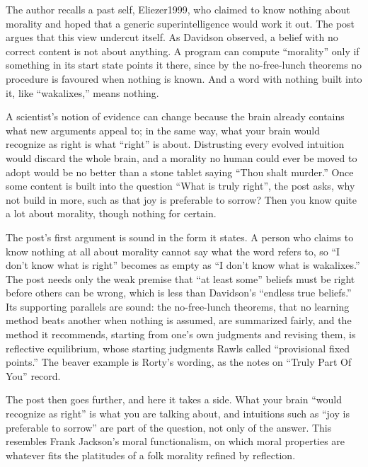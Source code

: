 \begin{afterword}
\summaryhead

The author recalls a past self, Eliezer1999, who claimed to know nothing about morality and hoped that a generic superintelligence would work it out. The post argues that this view undercut itself. As Davidson observed, a belief with no correct content is not about anything. A program can compute ``morality'' only if something in its start state points it there, since by the no-free-lunch theorems no procedure is favoured when nothing is known. And a word with nothing built into it, like ``wakalixes,'' means nothing.

A scientist's notion of evidence can change because the brain already contains what new arguments appeal to; in the same way, what your brain would recognize as right is what ``right'' is about. Distrusting every evolved intuition would discard the whole brain, and a morality no human could ever be moved to adopt would be no better than a stone tablet saying ``Thou shalt murder.'' Once some content is built into the question ``What is truly right'', the post asks, why not build in more, such as that joy is preferable to sorrow? Then you know quite a lot about morality, though nothing for certain.

\responsehead

The post's first argument is sound in the form it states. A person who claims to know nothing at all about morality cannot say what the word refers to, so ``I don't know what is right'' becomes as empty as ``I don't know what is wakalixes.'' The post needs only the weak premise that ``at least some'' beliefs must be right before others can be wrong, which is less than Davidson's ``endless true beliefs.'' Its supporting parallels are sound: the no-free-lunch theorems, that no learning method beats another when nothing is assumed, are summarized fairly, and the method it recommends, starting from one's own judgments and revising them, is reflective equilibrium, whose starting judgments Rawls called ``provisional fixed points.'' The beaver example is Rorty's wording, as the notes on ``Truly Part Of You'' record.

The post then goes further, and here it takes a side. What your brain ``would recognize as right'' is what you are talking about, and intuitions such as ``joy is preferable to sorrow'' are part of the question, not only of the answer. This resembles Frank Jackson's moral functionalism, on which moral properties are whatever fits the platitudes of a folk morality refined by reflection.


\end{afterword}
